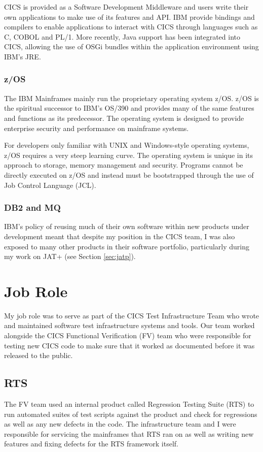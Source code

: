 \documentclass[12pt,a4paper]{article}
\begin{document}
CICS is provided as a Software Development Middleware and users write their own
applications to make use of its features and API. IBM provide bindings and
compilers to enable applications to interact with CICS through languages such as
C, COBOL and PL/1. More recently, Java support has been integrated into CICS,
allowing the use of OSGi bundles within the application environment using IBM's
JRE.

\subsubsection{z/OS}
The IBM Mainframes mainly run the proprietary operating system z/OS. z/OS is the
spiritual successor to IBM's OS/390 and provides many of the same features 
and functions as its predecessor. The operating system is designed to provide
enterprise security and performance on mainframe systems.

For developers only familiar with UNIX and Windows-style operating systems, z/OS 
requires a very steep learning curve. The operating system is unique in its
approach to storage, memory management and security. Programs cannot be 
directly executed on z/OS and instead must be bootstrapped through the use
of Job Control Language (JCL). 

\subsubsection{DB2 and MQ}
IBM's policy of reusing much of their own software within new products under
development meant that despite my position in the CICS team, I was also exposed
to many other products in their software portfolio, particularly during my work
on JAT+ (see Section \ref{sec:jatp}).

\section{Job Role}
\label{sec:myteam}
My job role was to serve as part of the CICS Test Infrastructure Team who wrote
and maintained software test infrastructure systems and tools. Our team worked
alongside the CICS Functional Verification (FV) team who were responsible for
testing new CICS code to make sure that it worked as documented before it was
released to the public. 

\subsection{RTS}
The FV team used an internal product called Regression Testing Suite (RTS) to
run automated suites of test scripts against the product and check for
regressions as well as any new defects in the code. The infrastructure team and
I were responsible for servicing the mainframes that RTS ran on as well as
writing new features and fixing defects for the RTS framework itself.
\end{document}
